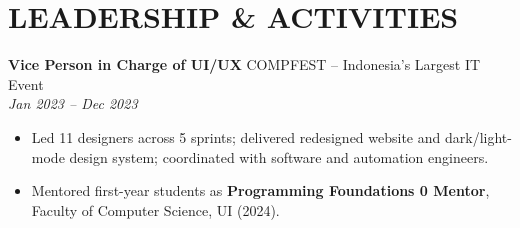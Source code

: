 \documentclass[10pt,a4paper]{article}
\newcommand{\experienceheader}[4]{
    \textbf{#1} \hfill #2 \\
    \textit{#3} \hfill \textit{#4}
}
\begin{document}
\vspace{-4pt}

\section*{LEADERSHIP \& ACTIVITIES}

\experienceheader{Vice Person in Charge of UI/UX}{COMPFEST -- Indonesia's Largest IT Event}{}{Jan 2023 -- Dec 2023}
\begin{itemize}[leftmargin=*, itemsep=1pt, topsep=1pt]
    \item Led 11 designers across 5 sprints; delivered redesigned website and dark/light-mode design system; coordinated with software and automation engineers.
    \item Mentored first-year students as \textbf{Programming Foundations 0 Mentor}, Faculty of Computer Science, UI (2024).
\end{itemize}
\end{document}
